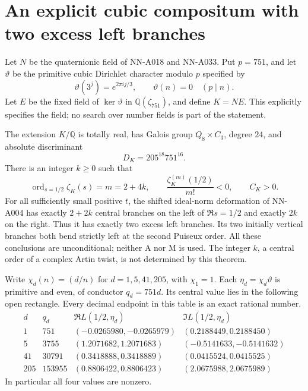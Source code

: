 \section{An explicit cubic compositum with two excess left branches}
\label{sec:analytic-cubic-left-imbalance}

Let $N$ be the quaternionic field of NN-A018 and NN-A033.
Put $p=751$, and let $\vartheta$ be the primitive cubic
Dirichlet character modulo $p$ specified by
\[
  \vartheta(3^j)=e^{2\pi ij/3},\qquad
  \vartheta(n)=0\quad(p\mid n).
\]
Let $E$ be the fixed field of $\ker\vartheta$ in
$\mathbb Q(\zeta_{751})$, and define $K=NE$.
This explicitly specifies the field; no search over number
fields is part of the statement.

\begin{theorem}
\label{thm:analytic-cubic-left-imbalance}
The extension $K/\mathbb Q$ is totally real, has Galois group
$Q_8\times C_3$, degree $24$, and absolute discriminant
\[
                   D_K=205^{18}751^{16}.
\]
There is an integer $k\ge0$ such that
\[
 \operatorname{ord}_{s=1/2}\zeta_K(s)=m=2+4k,
 \qquad \frac{\zeta_K^{(m)}(1/2)}{m!}<0,
 \qquad C_K>0.
\]
For all sufficiently small positive $t$, the shifted ideal-norm
deformation of NN-A004 has exactly $2+2k$ central branches on
the left of $\Re s=1/2$ and exactly $2k$ on the right. Thus it
has exactly two excess left branches. Its two initially vertical
branches both bend strictly left at the second Puiseux order.
All these conclusions are unconditional; neither A nor M is
used. The integer $k$, a central order of a complex Artin
twist, is not determined by this theorem.
\end{theorem}

\begin{lemma}
\label{lem:analytic-cubic-four-values}
Write $\chi_d(n)=(d/n)$ for $d=1,5,41,205$, with
$\chi_1=1$. Each $\eta_d=\chi_d\vartheta$ is primitive and
even, of conductor $q_d=751d$. Its central value lies in the
following open rectangle. Every decimal endpoint in this table
is an exact rational number.
\[
\begin{array}{c|r|c|c}
d&q_d&\Re L(1/2,\eta_d)&\Im L(1/2,\eta_d)\\\hline
1&751&(-0.0265980,-0.0265979)&(0.2188449,0.2188450)\\
5&3755&(1.2071682,1.2071683)&(-0.5141633,-0.5141632)\\
41&30791&(0.3418888,0.3418889)&(0.0415524,0.0415525)\\
205&153955&(0.8806422,0.8806423)&(2.0675988,2.0675989)
\end{array}
\]
In particular all four values are nonzero.
\end{lemma}

